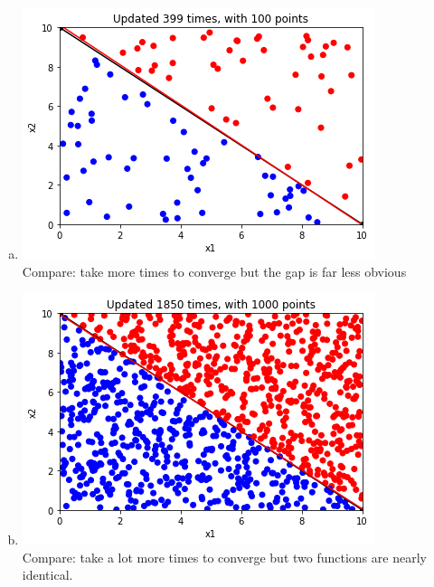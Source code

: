 \documentclass{article}
\begin{document}
\begin{enumerate}[a)]
    \item \includegraphics{1.4/4} \\ Compare: take more times to converge but the gap is far less obvious
    \item \includegraphics{1.4/5} \\ Compare: take a lot more times to converge but two functions are nearly identical.
\end{enumerate}
\end{document}
